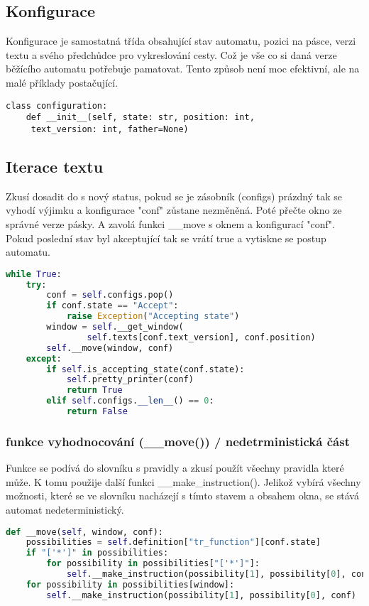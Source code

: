 \documentclass{article}
\begin{document}
\subsection{Konfigurace}
Konfigurace je samostatná třída obsahující stav automatu, pozici na pásce,
verzi textu a svého předchůdce pro vykreslování cesty.
Což je vše co si daná verze běžícího automatu potřebuje pamatovat.
Tento způsob není moc efektivní, ale na malé příklady postačující.

\begin{lstlisting}
class configuration:
	def __init__(self, state: str, position: int,
	 text_version: int, father=None)
\end{lstlisting}

\subsection{Iterace textu}
Zkusí dosadit do s nový status, pokud se je zásobník (configs) prázdný tak se vyhodí výjimku a konfigurace "conf" zůstane nezměněná.
Poté přečte okno ze správné verze pásky.
A zavolá funkci \_\_move s oknem a konfigurací "conf".
Pokud poslední stav byl akceptující tak se vrátí true a vytiskne se postup automatu.
\begin{lstlisting}[language=Python]
while True:
	try:
		conf = self.configs.pop()
		if conf.state == "Accept":
			raise Exception("Accepting state")
		window = self.__get_window(
				self.texts[conf.text_version], conf.position)
		self.__move(window, conf)
	except:
		if self.is_accepting_state(conf.state):
			self.pretty_printer(conf)
			return True
		elif self.configs.__len__() == 0:
			return False
\end{lstlisting}

\subsubsection{funkce vyhodnocování (\_\_move()) / nedetrministická část}
Funkce se podívá do slovníku s pravidly a zkusí použít všechny pravidla které může.
K tomu použije další funkci \_\_make\_instruction().
Jelikož vybírá všechny možnosti, které se ve slovníku nacházejí s tímto stavem a obsahem okna, se stává automat nedeterministický.

\begin{lstlisting}[language=Python]
def __move(self, window, conf):
	possibilities = self.definition["tr_function"][conf.state]
	if "['*']" in possibilities:
		for possibility in possibilities["['*']"]:
			self.__make_instruction(possibility[1], possibility[0], conf)
	for possibility in possibilities[window]:
		self.__make_instruction(possibility[1], possibility[0], conf)
\end{lstlisting}
\end{document}
